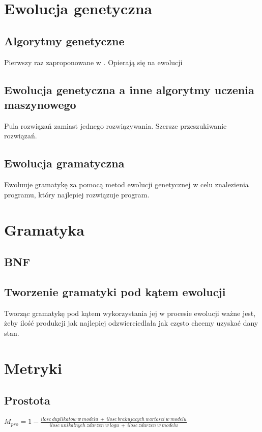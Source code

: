 \section{Ewolucja genetyczna}
\label{sec:ewolucjaGenetyczne}
\subsection{Algorytmy genetyczne}
Pierwszy raz zaproponowane w \cite{10.5555/138936}. Opierają się na ewolucji 
\subsection{Ewolucja genetyczna a inne algorytmy uczenia maszynowego}
Pula rozwiązań zamiast jednego rozwiązywania. Szersze przeszukiwanie rozwiązań. 
\subsection{Ewolucja gramatyczna}
Ewoluuje gramatykę za pomocą metod ewolucji genetycznej w celu znalezienia programu, który najlepiej rozwiązuje program.


\section{Gramatyka}
\label{sec:gramatyka}
\subsection{BNF}
\subsection{Tworzenie gramatyki pod kątem ewolucji}

Tworząc gramatykę pod kątem wykorzystania jej w procesie ewolucji ważne jest, żeby ilość produkcji jak najlepiej odzwierciedlała jak często chcemy uzyskać dany stan.


\section{Metryki}
\label{sec:metryki}
\cite{doi:10.1142/S0218843014400012}
\subsection{Prostota}
$M_{pro} = 1 - \frac{ilosc\ duplikatow\ w\ modelu\ +\ ilosc\ brakujacych\ wartosci\ w\ modelu}{ilosc\ unikalnych\ zdarzen\ w\ logu\ +\ ilosc\ zdarzen\ w\ modelu}$
